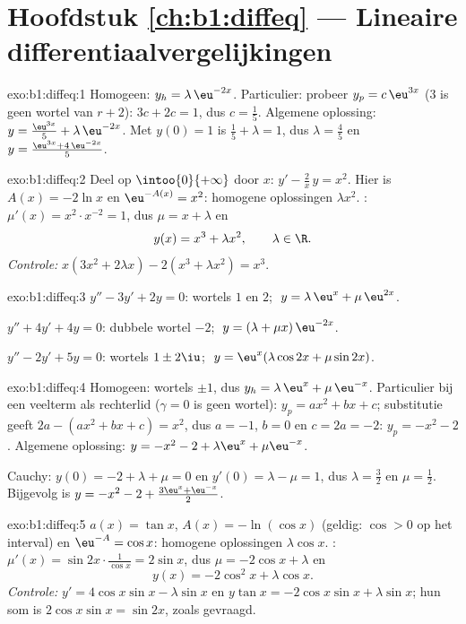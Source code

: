 \section*{Hoofdstuk \ref{ch:b1:diffeq} --- Lineaire differentiaalvergelijkingen}

\begin{solution}{exo:b1:diffeq:1}
Homogeen: $y_h = \lambda\,\eu^{-2x}$. Particulier: probeer $y_p =
c\,\eu^{3x}$ ($3$ is geen wortel van $r + 2$): $3c + 2c = 1$, dus $c =
\frac15$. Algemene oplossing: $y = \frac{\eu^{3x}}{5} +
\lambda\,\eu^{-2x}$. Met $y(0) = 1$ is $\frac15 + \lambda = 1$, dus
$\lambda = \frac45$ en $y = \frac{\eu^{3x} + 4\,\eu^{-2x}}{5}$.
\end{solution}

\begin{solution}{exo:b1:diffeq:2}
Deel op $\intoo{0}{+\infty}$ door $x$: $y' - \frac{2}{x}\,y = x^2$. Hier
is $A(x) = -2\ln x$ en $\eu^{-A(x)} = x^2$: homogene oplossingen $\lambda
x^2$. : $\mu'(x) = x^2 \cdot x^{-2} = 1$, dus $\mu
= x + \lambda$ en
\[
y(x) = x^3 + \lambda x^2, \qquad \lambda \in \R .
\]
\emph{Controle:} $x(3x^2 + 2\lambda x) - 2(x^3 + \lambda x^2) = x^3$.
\end{solution}

\begin{solution}{exo:b1:diffeq:3}
$y'' - 3y' + 2y = 0$: wortels $1$ en $2$; $\;y = \lambda\,\eu^{x} +
\mu\,\eu^{2x}$.

$y'' + 4y' + 4y = 0$: dubbele wortel $-2$; $\;y = (\lambda + \mu
x)\,\eu^{-2x}$.

$y'' - 2y' + 5y = 0$: wortels $1 \pm 2\iu$; $\;y = \eu^{x}(\lambda\cos
2x + \mu\sin 2x)$.
\end{solution}

\begin{solution}{exo:b1:diffeq:4}
Homogeen: wortels $\pm 1$, dus $y_h = \lambda\,\eu^x + \mu\,\eu^{-x}$.
Particulier bij een veelterm als rechterlid ($\gamma = 0$ is geen
wortel): $y_p = ax^2 + bx + c$; substitutie geeft $2a - (ax^2 + bx + c) =
x^2$, dus $a = -1$, $b = 0$ en $c = 2a = -2$: $y_p = -x^2 - 2$. Algemene
oplossing: $y = -x^2 - 2 + \lambda\eu^x + \mu\eu^{-x}$.

Cauchy: $y(0) = -2 + \lambda + \mu = 0$ en $y'(0) = \lambda - \mu = 1$,
dus $\lambda = \frac32$ en $\mu = \frac12$. Bijgevolg is $y = -x^2 - 2 +
\frac{3\eu^x + \eu^{-x}}{2}$.
\end{solution}

\begin{solution}{exo:b1:diffeq:5}
$a(x) = \tan x$, $A(x) = -\ln(\cos x)$ (geldig: $\cos > 0$ op het
interval) en $\eu^{-A} = \cos x$: homogene oplossingen $\lambda\cos x$.
: $\mu'(x) = \sin 2x \cdot \frac{1}{\cos x} =
2\sin x$, dus $\mu = -2\cos x + \lambda$ en
\[
y(x) = -2\cos^2 x + \lambda \cos x .
\]
\emph{Controle:} $y' = 4\cos x \sin x - \lambda\sin x$ en $y\tan x =
-2\cos x\sin x + \lambda \sin x$; hun som is $2\cos x\sin x = \sin 2x$,
zoals gevraagd.
\end{solution}

